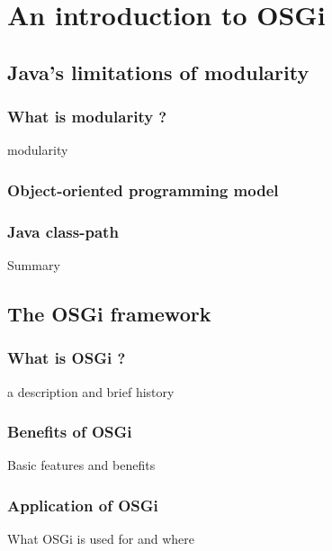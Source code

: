 \chapter{An introduction to OSGi}

\section{Java's limitations of modularity}
\subsection{What is modularity ?}
modularity
\subsection{Object-oriented programming model}

\subsection{Java class-path}
Summary
\section{The OSGi framework}

\subsection{What is OSGi ?}
a description and brief history

\subsection{Benefits of OSGi}
Basic features and benefits
\subsection{Application of OSGi}
What OSGi is used for and where
